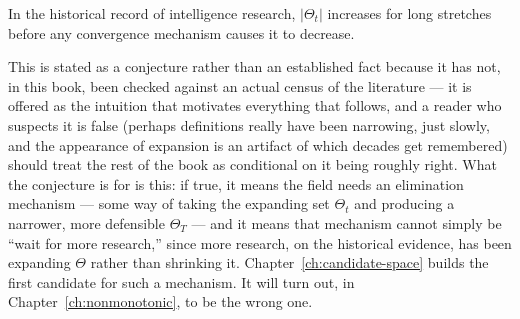 \begin{conjecture}
In the historical record of intelligence research, $|\Theta_t|$ increases for long stretches before any convergence mechanism causes it to decrease.
\end{conjecture}

This is stated as a conjecture rather than an established fact because it has not, in this book, been checked against an actual census of the literature --- it is offered as the intuition that motivates everything that follows, and a reader who suspects it is false (perhaps definitions really have been narrowing, just slowly, and the appearance of expansion is an artifact of which decades get remembered) should treat the rest of the book as conditional on it being roughly right. What the conjecture is for is this: if true, it means the field needs an elimination mechanism --- some way of taking the expanding set $\Theta_t$ and producing a narrower, more defensible $\Theta_T$ --- and it means that mechanism cannot simply be ``wait for more research,'' since more research, on the historical evidence, has been expanding $\Theta$ rather than shrinking it. Chapter~\ref{ch:candidate-space} builds the first candidate for such a mechanism. It will turn out, in Chapter~\ref{ch:nonmonotonic}, to be the wrong one.
